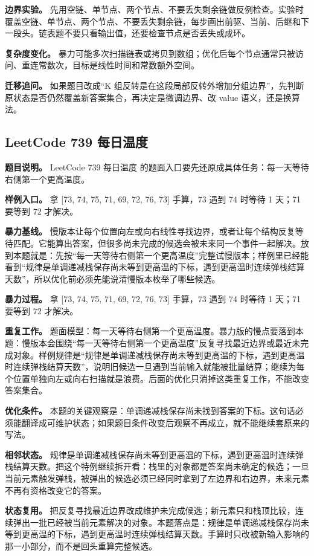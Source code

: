 \textbf{边界实验。} 先用空链、单节点、两个节点、不要丢失剩余链做反例检查。实验时覆盖空链、单节点、两个节点、不要丢失剩余链，每步画出前驱、当前、后继和下一段头。链表题不要只看输出值，还要检查节点是否丢失或成环。

\textbf{复杂度变化。} 暴力可能多次扫描链表或拷贝到数组；优化后每个节点通常只被访问、重连常数次，目标是线性时间和常数额外空间。

\textbf{迁移追问。} 如果题目改成“K 组反转是在这段局部反转外增加分组边界”，先判断原状态是否仍然覆盖新答案集合，再决定是微调边界、改 value 语义，还是换算法。

\subsection{LeetCode 739 每日温度}

\textbf{题目说明。} LeetCode 739 每日温度 的题面入口要先还原成具体任务：每一天等待右侧第一个更高温度。

\textbf{样例入口。} 拿 [73, 74, 75, 71, 69, 72, 76, 73] 手算，73 遇到 74 时等待 1 天；71 要等到 72 才解决。

\textbf{暴力基线。} 慢版本让每个位置向左或向右线性寻找边界，或者让每个结构反复等待匹配。它能算出答案，但很多尚未完成的候选会被未来同一个事件一起解决。放到本题就是：先按“每一天等待右侧第一个更高温度”完整试慢版本；样例里已经能看到“规律是单调递减栈保存尚未等到更高温的下标，遇到更高温时连续弹栈结算天数”，所以优化前必须先能说清慢版本枚举了哪些候选。

\textbf{暴力过程。} 拿 [73, 74, 75, 71, 69, 72, 76, 73] 手算，73 遇到 74 时等待 1 天；71 要等到 72 才解决。

\textbf{重复工作。} 题面模型：每一天等待右侧第一个更高温度。暴力版的慢点要落到本题：慢版本会围绕“每一天等待右侧第一个更高温度”反复寻找最近边界或最近未完成对象。样例规律是“规律是单调递减栈保存尚未等到更高温的下标，遇到更高温时连续弹栈结算天数”，说明旧候选一旦遇到当前输入就能被批量结算；继续为每个位置单独向左或向右扫描就是浪费。后面的优化只消掉这类重复工作，不能改变答案集合。

\textbf{优化条件。} 本题的关键观察是：单调递减栈保存尚未找到答案的下标。这句话必须能翻译成可维护状态；如果题目条件改变后观察不再成立，就不能继续套原来的写法。

\textbf{相邻状态。} 规律是单调递减栈保存尚未等到更高温的下标，遇到更高温时连续弹栈结算天数。把这个特例继续拆开看：栈里的对象都是答案尚未确定的候选；一旦当前元素触发弹栈，被弹出的候选必须已经同时拿到了左边界和右边界，未来元素不再有资格改变它的答案。

\textbf{状态复用。} 把反复寻找最近边界改成维护未完成候选；新元素只和栈顶比较，连续弹出一批已经被当前元素解决的对象。本题落点是：规律是单调递减栈保存尚未等到更高温的下标，遇到更高温时连续弹栈结算天数。手算时只改被新输入影响的那一小部分，而不是回头重算完整候选。

